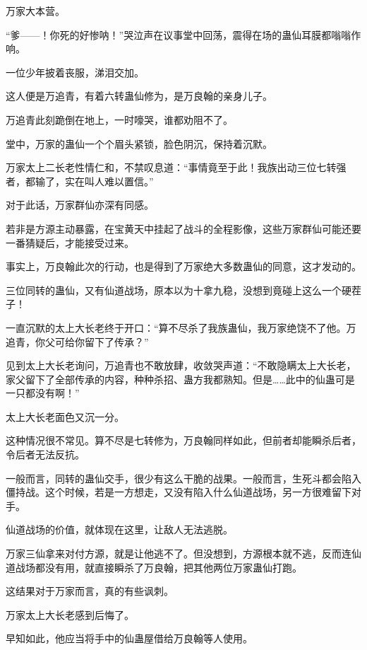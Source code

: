
\begin{this_body}



万家大本营。

“爹——！你死的好惨呐！”哭泣声在议事堂中回荡，震得在场的蛊仙耳膜都嗡嗡作响。

一位少年披着丧服，涕泪交加。

这人便是万追青，有着六转蛊仙修为，是万良翰的亲身儿子。

万追青此刻跪倒在地上，一时嚎哭，谁都劝阻不了。

堂中，万家的蛊仙一个个眉头紧锁，脸色阴沉，保持着沉默。

万家太上二长老性情仁和，不禁叹息道：“事情竟至于此！我族出动三位七转强者，都输了，实在叫人难以置信。”

对于此话，万家群仙亦深有同感。

若非是方源主动暴露，在宝黄天中挂起了战斗的全程影像，这些万家群仙可能还要一番猜疑后，才能接受过来。

事实上，万良翰此次的行动，也是得到了万家绝大多数蛊仙的同意，这才发动的。

三位同转的蛊仙，又有仙道战场，原本以为十拿九稳，没想到竟碰上这么一个硬茬子！

一直沉默的太上大长老终于开口：“算不尽杀了我族蛊仙，我万家绝饶不了他。万追青，你父可给你留下了传承？”

见到太上大长老询问，万追青也不敢放肆，收敛哭声道：“不敢隐瞒太上大长老，家父留下了全部传承的内容，种种杀招、蛊方我都熟知。但是……此中的仙蛊可是一只都没有啊！”

太上大长老面色又沉一分。

这种情况很不常见。算不尽是七转修为，万良翰同样如此，但前者却能瞬杀后者，令后者无法反抗。

一般而言，同转的蛊仙交手，很少有这么干脆的战果。一般而言，生死斗都会陷入僵持战。这个时候，若是一方想走，又没有陷入什么仙道战场，另一方很难留下对手。

仙道战场的价值，就体现在这里，让敌人无法逃脱。

万家三仙拿来对付方源，就是让他逃不了。但没想到，方源根本就不逃，反而连仙道战场都没有用，就直接瞬杀了万良翰，把其他两位万家蛊仙打跑。

这结果对于万家而言，真的有些讽刺。

万家太上大长老感到后悔了。

早知如此，他应当将手中的仙蛊屋借给万良翰等人使用。


\end{this_body}
